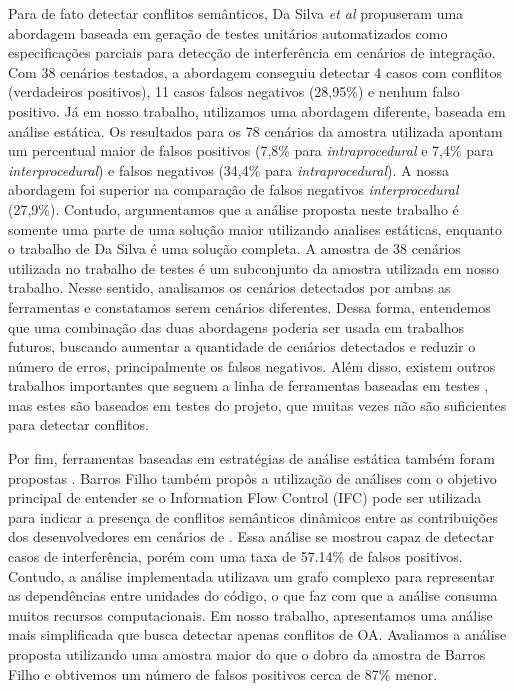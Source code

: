 Para de fato detectar conflitos semânticos, Da Silva \emph{et al} \cite{LeusonSilva2020} propuseram uma abordagem baseada em geração de testes unitários automatizados como especificações parciais para detecção de interferência em cenários de integração. Com 38 cenários testados, a abordagem conseguiu detectar 4 casos com conflitos (verdadeiros positivos), 11 casos falsos negativos (28,95\%) e nenhum falso positivo. Já em nosso trabalho, utilizamos uma abordagem diferente, baseada em análise estática. Os resultados para os 78 cenários da amostra utilizada apontam um percentual maior de falsos positivos (7,8\% para \emph{intraprocedural} e 7,4\% para \emph{interprocedural}) e falsos negativos (34,4\% para \emph{intraprocedural}). A nossa abordagem foi superior na comparação de falsos negativos \emph{interprocedural} (27,9\%). Contudo, argumentamos que a análise proposta neste trabalho é somente uma parte de uma solução maior utilizando analises estáticas, enquanto o trabalho de Da Silva é uma solução completa. A amostra de 38 cenários utilizada no trabalho de testes é um subconjunto da amostra utilizada em nosso trabalho. Nesse sentido, analisamos os cenários detectados por ambas as ferramentas e constatamos serem cenários diferentes. Dessa forma, entendemos que uma combinação das duas abordagens poderia ser usada em trabalhos futuros, buscando aumentar a quantidade de cenários detectados e reduzir o número de erros, principalmente os falsos negativos. Além disso, existem outros trabalhos importantes que seguem a linha de ferramentas baseadas em testes \cite{brun, 10.1145/2786805.2803208, 10.1145/2568225.2568300}, mas estes são baseados em testes do projeto, que muitas vezes não são suficientes para detectar conflitos.

Por fim, ferramentas baseadas em estratégias de análise estática também foram propostas \cite{10.1145/201055.201056, 10.1145/65979.65980, 336770, 10.1145/131736.131756, Horwitz1989IntegratingNV, 10.1145/3276535, 1113835899}. Barros Filho \cite{InformationFlowRoberto} também propôs a utilização de análises com o objetivo principal de entender se o Information Flow Control (IFC) pode ser utilizada para indicar a presença de conflitos semânticos dinâmicos entre as contribuições dos desenvolvedores em cenários de . Essa análise se mostrou capaz de detectar casos de interferência, porém com uma taxa de 57.14\% de falsos positivos. Contudo, a análise implementada utilizava um grafo complexo para representar as dependências entre unidades do código, o que faz com que a análise consuma muitos recursos computacionais. Em nosso trabalho, apresentamos uma análise mais simplificada que busca detectar apenas conflitos de OA. Avaliamos a análise proposta utilizando uma amostra maior do que o dobro da amostra de Barros Filho e obtivemos um número de falsos positivos cerca de 87\% menor.